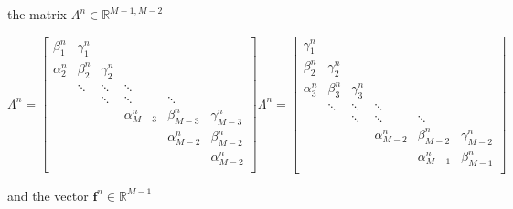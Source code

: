 the matrix $\Lambda^{n} \in \mathbb{R}^{M-1,M-2}$ 

\begin{subequations}
  \begin{equation}
    \Lambda^{n} = \begin{bmatrix}
      \beta^{n}_{1} & \gamma^{n}_1 \\
      \alpha^{n}_{2} & \beta^{n}_{2} & \gamma^{n}_{2} \\
      & \ddots & \ddots & \ddots  \\
      & & \ddots & \ddots & \ddots  \\
      & & & \alpha^{n}_{M-3} & \beta^{n}_{M-3} & \gamma^{n}_{M-3} \\
      & & & & \alpha^{n}_{M-2} & \beta^{n}_{M-2} \\
      & & & & & \alpha^{n}_{M-2} \\
    \end{bmatrix}
  \end{equation}
  \begin{equation}
    \Lambda^{n} = \begin{bmatrix}
      \gamma^{n}_1 \\
      \beta^{n}_2 & \gamma^{n}_2 \\
      \alpha^{n}_3 & \beta^{n}_3 & \gamma^{n}_3 \\
      & \ddots & \ddots & \ddots \\
      & & \ddots & \ddots & \ddots \\
      & & & \alpha^{n}_{M-2} & \beta^{n}_{M-2} & \gamma^{n}_{M-2} \\
      & & & & \alpha^{n}_{M-1} & \beta^{n}_{M-1} \\
    \end{bmatrix}
  \end{equation}
\end{subequations}

and the vector $\mathbf{f}^{n} \in \mathbb{R}^{M-1}$

